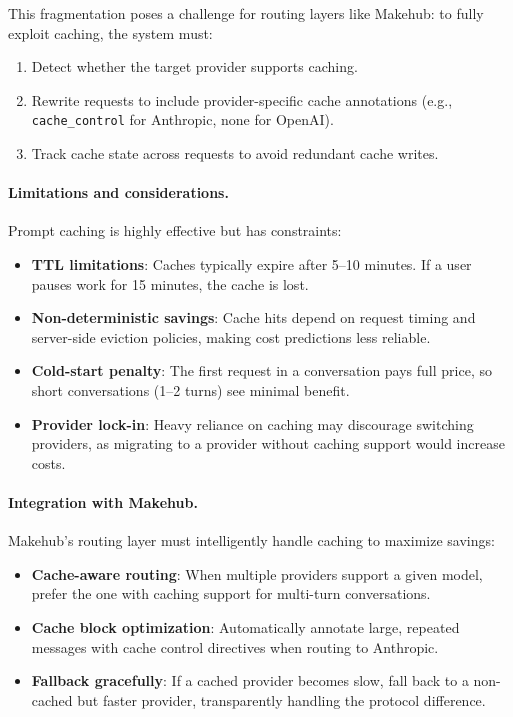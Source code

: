 \documentclass[english]{article}
\begin{document}
This fragmentation poses a challenge for routing layers like Makehub: to fully exploit caching, the system must:
\begin{enumerate}
    \item Detect whether the target provider supports caching.
    \item Rewrite requests to include provider-specific cache annotations (e.g., \texttt{cache\_control} for Anthropic, none for OpenAI).
    \item Track cache state across requests to avoid redundant cache writes.
\end{enumerate}

\paragraph{Limitations and considerations.}

Prompt caching is highly effective but has constraints:
\begin{itemize}
    \item \textbf{TTL limitations}: Caches typically expire after 5--10 minutes. If a user pauses work for 15 minutes, the cache is lost.
    \item \textbf{Non-deterministic savings}: Cache hits depend on request timing and server-side eviction policies, making cost predictions less reliable.
    \item \textbf{Cold-start penalty}: The first request in a conversation pays full price, so short conversations (1--2 turns) see minimal benefit.
    \item \textbf{Provider lock-in}: Heavy reliance on caching may discourage switching providers, as migrating to a provider without caching support would increase costs.
\end{itemize}

\paragraph{Integration with Makehub.}

Makehub's routing layer must intelligently handle caching to maximize savings:
\begin{itemize}
    \item \textbf{Cache-aware routing}: When multiple providers support a given model, prefer the one with caching support for multi-turn conversations.
    \item \textbf{Cache block optimization}: Automatically annotate large, repeated messages with cache control directives when routing to Anthropic.
    \item \textbf{Fallback gracefully}: If a cached provider becomes slow, fall back to a non-cached but faster provider, transparently handling the protocol difference.
\end{itemize}
\end{document}
